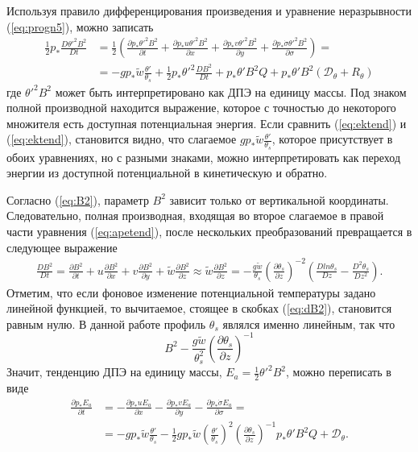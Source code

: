 \documentclass[12pt,a4paper]{report}
\begin{document}
Используя правило дифференцирования произведения и уравнение неразрывности (\ref{eq:progn5}), можно записать
\begin{align}
\frac{1}{2}p_*\frac{D\theta'^2B^2}{Dt}&=\frac{1}{2}\left(\frac{\partial{p_*\theta'^2B^2}}{\partial{t}}+\frac{\partial{p_*u\theta'^2B^2}}{\partial{x}}+\frac{\partial{p_*v\theta'^2B^2}}{\partial{y}}+\frac{\partial{p_*\dot{\sigma}\theta'^2B^2}}{\partial{\sigma}}\right)= \nonumber\\ 
&=-gp_*\tilde{w}\frac{\theta'}{\theta_s}+\frac{1}{2}p_*\theta'^2\frac{DB^2}{Dt}+p_*\theta'B^2Q+p_*\theta'B^2(\mathcal{D}_{\theta}+R_{\theta}) \label{eq:apetend}
\end{align}
где $\theta'^2B^2$ может быть интерпретировано как ДПЭ на единицу массы. Под знаком полной производной находится выражение, которое с точностью до некоторого множителя есть доступная потенциальная энергия. Если сравнить (\ref{eq:ektend}) и (\ref{eq:ektend}), становится видно, что слагаемое $gp_*\tilde{w}\frac{\theta'}{\theta_s}$, которое присутствует в обоих уравнениях, но с разными знаками, можно интерпретировать как переход энергии из доступной потенциальной в кинетическую и обратно.

Согласно (\ref{eq:B2}), параметр $B^2$ зависит только от вертикальной координаты. Следовательно, полная производная, входящая во второе слагаемое в правой части уравнения (\ref{eq:apetend}), после нескольких преобразований превращается в следующее выражение
\begin{align}
\frac{DB^2}{Dt}=\frac{\partial{B^2}}{\partial{t}}+u \frac{\partial{B^2}}{\partial{x}}+v\frac{\partial{B^2}}{\partial{y}}+\tilde{w}\frac{\partial{B^2}}{\partial{z}} \approx \tilde{w}\frac{\partial{B^2}}{\partial{z}}=-\frac{g\tilde{w}}{\theta_s}\left(\frac{\partial\theta_s}{\partial{z}}\right)^{-2}\left(\frac{Dln\theta_s}{Dz}-\frac{D^2\theta_s}{Dz^2}\right) \label{eq:dB2}.
\end{align}
Отметим, что если фоновое изменение потенциальной температуры задано линейной функцией, то вычитаемое, стоящее в скобках (\ref{eq:dB2}), становится равным нулю. В данной работе профиль $\theta_s$ являлся именно линейным, так что 
\begin{equation}
B^2-\frac{g\tilde{w}}{\theta_s^2}\left(\frac{\partial\theta_s}{\partial{z}}\right)^{-1}
\end{equation}
Значит, тенденцию ДПЭ на единицу массы, $E_a=\frac{1}{2}\theta'^2B^2$, можно переписать в виде
\begin{align}
\frac{\partial p_*E_a}{\partial{t}}&=-\frac{\partial{p_*uE_a}}{\partial{x}}-\frac{\partial{p_*vE_a}}{\partial{y}}-\frac{\partial{p_*\dot{\sigma}E_a}}{\partial{\sigma}}= \nonumber\\ 
&=-gp_*\tilde{w}\frac{\theta'}{\theta_s}-\frac{1}{2}gp_*\tilde{w}\left(\frac{\theta'}{\theta_s}\right)^2\left(\frac{\partial\theta_s}{\partial{z}}\right)^{-1}p_*\theta'B^2Q+\mathcal{D}_\theta \label{eq:apetend2}.
\end{align} %
\end{document}
